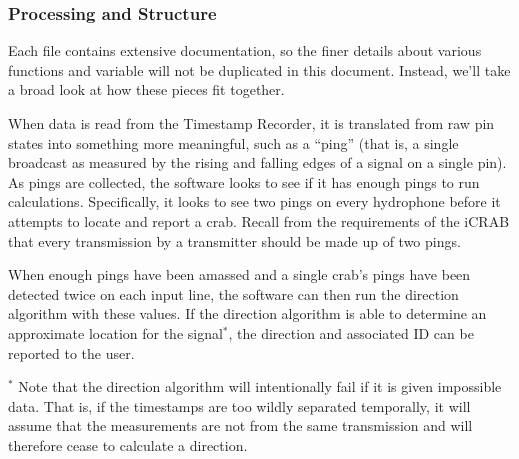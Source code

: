 \documentclass[12pt]{article}
\begin{document}
\subsubsection{Processing and Structure}

Each file contains extensive documentation, so the finer details about
various functions and variable will not be
duplicated in this document. Instead, we'll take a broad look at how these
pieces fit together.

When data is read from the Timestamp Recorder, it is translated from raw pin
states into something more meaningful, such as a ``ping'' (that is, a single
broadcast as measured by the rising and falling edges of a signal on a single
pin).
As pings are collected, the software looks to see if it has enough pings to
run calculations.
Specifically, it looks to see two pings on every hydrophone before it attempts
to locate and report a crab.
Recall from the requirements of the \gls{iCRAB} that every transmission by
a transmitter should be made up of two pings.

When enough pings have been amassed and a single crab's pings have been
detected twice on each input line, the software can then run the direction
algorithm with these values.
If the direction algorithm is able to determine an approximate location for
the signal$^*$, the direction and associated ID can be reported to the user.

$^*$ Note that the direction algorithm will intentionally fail if it is given
impossible data.
That is, if the timestamps are too wildly separated temporally, it will assume
that the measurements are not from the same transmission and will therefore
cease to calculate a direction.

\newpage

\printglossary
\end{document}
